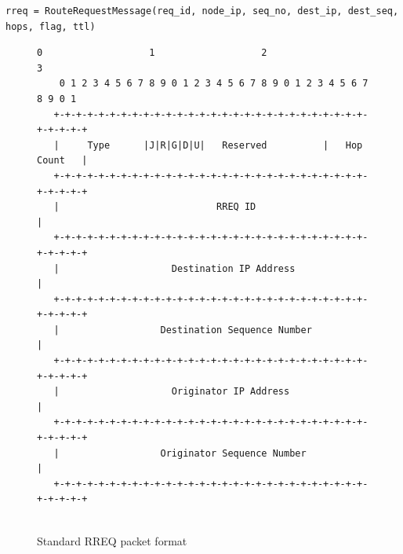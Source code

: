 \documentclass[]{nsm-thesis}
\begin{document}
\lstset{
  basicstyle=\ttfamily\small,  %
  numbers=left,               %
  numberstyle=\tiny,          %
  stepnumber=1,               %
  numbersep=5pt,              %
  showstringspaces=false,     %
  frame=single,               %
  breaklines=true,            %
  captionpos=b,               %
  language=Python             %
}
\begin{lstlisting}[caption={RREQ Creation}, label={lst:example}]
rreq = RouteRequestMessage(req_id, node_ip, seq_no, dest_ip, dest_seq, hops, flag, ttl)

\end{lstlisting}




\begin{figure}[h]
    \centering
\begin{verbatim}
0                   1                   2                   3
    0 1 2 3 4 5 6 7 8 9 0 1 2 3 4 5 6 7 8 9 0 1 2 3 4 5 6 7 8 9 0 1
   +-+-+-+-+-+-+-+-+-+-+-+-+-+-+-+-+-+-+-+-+-+-+-+-+-+-+-+-+-+-+-+-+
   |     Type      |J|R|G|D|U|   Reserved          |   Hop Count   |
   +-+-+-+-+-+-+-+-+-+-+-+-+-+-+-+-+-+-+-+-+-+-+-+-+-+-+-+-+-+-+-+-+
   |                            RREQ ID                            |
   +-+-+-+-+-+-+-+-+-+-+-+-+-+-+-+-+-+-+-+-+-+-+-+-+-+-+-+-+-+-+-+-+
   |                    Destination IP Address                     |
   +-+-+-+-+-+-+-+-+-+-+-+-+-+-+-+-+-+-+-+-+-+-+-+-+-+-+-+-+-+-+-+-+
   |                  Destination Sequence Number                  |
   +-+-+-+-+-+-+-+-+-+-+-+-+-+-+-+-+-+-+-+-+-+-+-+-+-+-+-+-+-+-+-+-+
   |                    Originator IP Address                      |
   +-+-+-+-+-+-+-+-+-+-+-+-+-+-+-+-+-+-+-+-+-+-+-+-+-+-+-+-+-+-+-+-+
   |                  Originator Sequence Number                   |
   +-+-+-+-+-+-+-+-+-+-+-+-+-+-+-+-+-+-+-+-+-+-+-+-+-+-+-+-+-+-+-+-+
 
\end{verbatim}
\caption{Standard RREQ packet format}
\end{figure}
\end{document}
